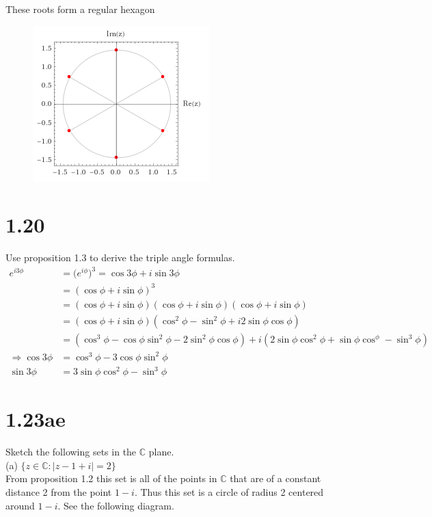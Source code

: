 \documentclass[a4paper, 11pt]{article}
\begin{document}
These roots form a regular hexagon
	\begin{figure}[!hbt]
		\centering
		\includegraphics[scale=0.75]{sixthRoots}		
	\end{figure}
	
\section*{1.20} 
Use proposition 1.3 to derive the triple angle formulas. 
	\begin{align*}
		e^{i3\phi} &= \Big(e^{i\phi}\Big)^3 = \cos3\phi + i \sin3\phi \\  
			&= (\cos\phi + i \sin\phi)^3 \\ 
			&= (\cos\phi + i \sin\phi) (\cos\phi + i \sin\phi) (\cos\phi + i \sin\phi)\\
			&=(\cos\phi + i \sin\phi)(\cos^2\phi-\sin^2\phi+i2\sin\phi\cos\phi)\\ 
			&= (\cos^3\phi-\cos\phi\sin^2\phi-2\sin^2\phi\cos\phi) +i(2\sin\phi\cos^2\phi+\sin\phi\cos^\phi-\sin^3\phi) \\ 
		\Rightarrow \cos3\phi &= \cos^3\phi - 3\cos\phi\sin^2\phi \\ 
			\sin3\phi &= 3\sin\phi\cos^2\phi - \sin^3\phi 
	\end{align*}
	
	
\section*{1.23ae} 
Sketch the following sets in the $\mathbb{C}$ plane. \\ 

\noindent(a) $\{z\in\mathbb{C}:|z-1+i|=2\}$\\

\noindent From proposition 1.2 this set is all of the points in $\mathbb{C}$ that are of a constant distance 2 from the point $1-i$. Thus this set is a circle of radius 2 centered around $1-i$. See the following diagram. \\ 
\end{document}

